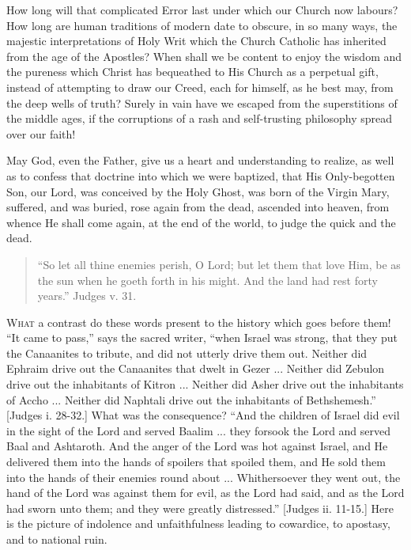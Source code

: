 How long will that complicated Error last under which our Church
now labours? How long are human traditions of modern date to obscure,
in so many ways, the majestic interpretations of Holy Writ which the
Church Catholic has inherited from the age of the Apostles? When shall
we be content to enjoy the wisdom and the pureness which Christ has
bequeathed to His Church as a perpetual gift, instead of attempting
to
draw our Creed, each for himself, as he best may, from the deep wells
of truth? Surely in vain have we escaped from the superstitions of the
middle ages, if the corruptions of a rash and self-trusting philosophy
spread over our faith!

May God, even the Father, give us a heart and understanding to
realize, as well as to confess that doctrine into which we were
baptized, that His Only-begotten Son, our Lord, was conceived by the
Holy Ghost, was born of the Virgin Mary, suffered, and was buried,
rose again from the dead, ascended into heaven, from whence He shall
come again, at the end of the world, to judge the quick and the dead.


\begin{quote}

``So let all thine enemies perish, O Lord; but let them that
love Him, be as the sun when he goeth forth in his might. And the
land had rest forty years.'' Judges v. 31.

\end{quote}

W\textsc{hat} a contrast do these words present to the history which goes
before them! ``It came to pass,'' says the sacred writer,
``when Israel was strong, that they put the Canaanites to tribute,
and did not utterly drive them out. Neither did Ephraim drive out the
Canaanites that dwelt in Gezer ... Neither did Zebulon drive out the
inhabitants of Kitron ... Neither did Asher drive out the inhabitants
of Accho ... Neither did Naphtali drive out the inhabitants of
Bethshemesh.'' [Judges i. 28-32.] What was the consequence?
``And the children of Israel did evil in the sight of the Lord and
served Baalim ... they forsook the Lord and served Baal and Ashtaroth.
And the anger of the Lord was hot against Israel, and He delivered
them into the hands of spoilers that spoiled them, and He sold them
into the hands of their enemies round about ... Whithersoever they
went out, the hand of the Lord was against them for evil, as the Lord
had said, and as the Lord had sworn unto them; and they were greatly
distressed.'' [Judges ii. 11-15.] Here is the picture of indolence
and unfaithfulness leading to cowardice, to apostasy, and to national
ruin.

